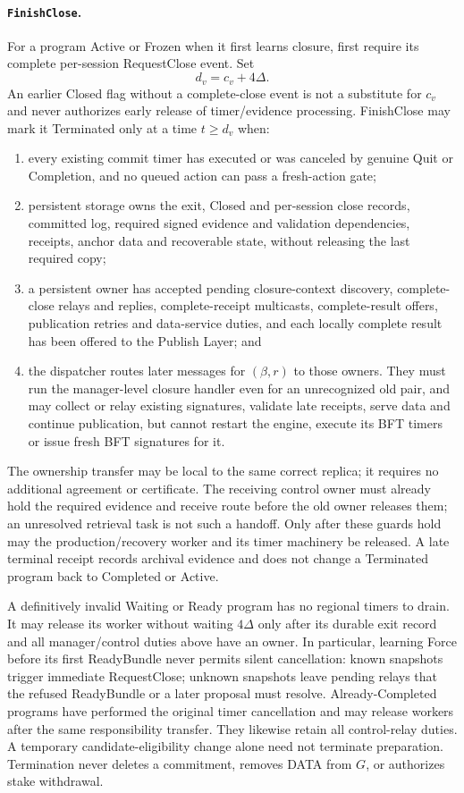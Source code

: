 \paragraph{\texttt{FinishClose}.}
For a program Active or Frozen when it first learns closure, first
require its complete per-session RequestClose event. Set
\[
 d_v=c_v+4\Delta.
\]
An earlier Closed flag without a complete-close event is not a substitute
for $c_v$ and never authorizes early release of timer/evidence processing.
FinishClose may mark it Terminated only at a time $t\ge d_v$ when:
\begin{enumerate}[label=(\roman*),itemsep=2pt]
\item every existing commit timer has executed or was canceled by
genuine Quit or Completion, and no queued action can pass a fresh-action
gate;
\item persistent storage owns the exit, Closed and per-session close records,
committed log, required signed evidence and validation dependencies,
receipts, anchor data and recoverable state, without releasing the last
required copy;
\item a persistent owner has accepted pending closure-context discovery,
complete-close relays and replies, complete-receipt multicasts,
complete-result offers, publication retries and data-service duties, and each locally complete result has been offered to the
Publish Layer; and
\item the dispatcher routes later messages for $(\beta,r)$ to those
owners. They must run the manager-level closure handler even for an
unrecognized old pair, and may collect or relay existing signatures,
validate late receipts, serve data and continue publication, but cannot restart the
engine, execute its BFT timers or issue fresh BFT signatures for it.
\end{enumerate}
The ownership transfer may be local to the same correct replica; it
requires no additional agreement or certificate. The receiving control
owner must already hold the required evidence and receive route before
the old owner releases them; an unresolved retrieval task is not such
a handoff. Only after these
guards hold may the production/recovery worker and its timer machinery
be released. A late terminal receipt records archival evidence and does
not change a Terminated program back to Completed or Active.

A definitively invalid Waiting or Ready program has no regional timers
to drain. It may release its worker without waiting $4\Delta$ only after
its durable exit record and all manager/control duties above have an
owner. In particular, learning Force before its first ReadyBundle never
permits silent cancellation: known snapshots trigger immediate
RequestClose; unknown snapshots leave pending relays that the refused
ReadyBundle or a later proposal must resolve. Already-Completed programs
have performed the original timer cancellation and may release workers
after the same responsibility transfer. They likewise retain all
control-relay duties. A temporary candidate-eligibility change alone
need not terminate preparation. Termination never deletes a commitment,
removes DATA from $G$, or authorizes stake withdrawal.

